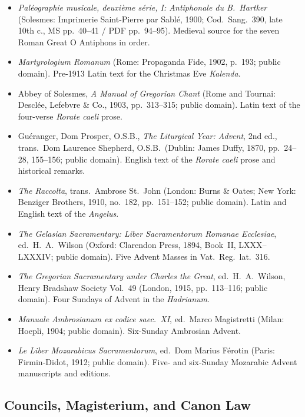 \begin{itemize}
(pp.~243--244), the Christmas Eve \textit{Kalenda} (p.~269), \textit{O magnum
mysterium} (p.~274), St.~Gregory's Homily~8 (p.~276), and \textit{O admirabile
commercium} and \textit{Quando natus es} (p.~315).
\item \textit{Pal\'eographie musicale, deuxi\`eme s\'erie, I: Antiphonale du
B.~Hartker} (Solesmes: Imprimerie Saint-Pierre par Sabl\'e, 1900; Cod.\ Sang.\
390, late 10th c., MS pp.~40--41 / PDF pp.~94--95). Medieval source for the
seven Roman Great O Antiphons in order.
\item \textit{Martyrologium Romanum} (Rome: Propaganda Fide, 1902, p.~193;
public domain). Pre-1913 Latin text for the Christmas Eve \textit{Kalenda}.
\item Abbey of Solesmes, \textit{A Manual of Gregorian Chant} (Rome and
Tournai: Descl\'ee, Lefebvre \& Co., 1903, pp.~313--315; public domain). Latin
text of the four-verse \textit{Rorate caeli} prose.
\item Gu\'eranger, Dom Prosper, O.S.B., \textit{The Liturgical Year: Advent},
2nd ed., trans.\ Dom Laurence Shepherd, O.S.B.\ (Dublin: James Duffy, 1870,
pp.~24--28, 155--156; public domain). English text of the \textit{Rorate caeli}
prose and historical remarks.
\item \textit{The Raccolta}, trans.\ Ambrose St.~John (London: Burns \& Oates;
New York: Benziger Brothers, 1910, no.~182, pp.~151--152; public domain). Latin
and English text of the \textit{Angelus}.
\item \textit{The Gelasian Sacramentary: Liber Sacramentorum Romanae
Ecclesiae}, ed.\ H.~A.~Wilson (Oxford: Clarendon Press, 1894, Book~II,
LXXX--LXXXIV; public domain). Five Advent Masses in Vat.\ Reg.\ lat.\ 316.
\item \textit{The Gregorian Sacramentary under Charles the Great}, ed.\
H.~A.~Wilson, Henry Bradshaw Society Vol.~49 (London, 1915, pp.~113--116;
public domain). Four Sundays of Advent in the \textit{Hadrianum}.
\item \textit{Manuale Ambrosianum ex codice saec.~XI}, ed.\ Marco Magistretti
(Milan: Hoepli, 1904; public domain). Six-Sunday Ambrosian Advent.
\item \textit{Le Liber Mozarabicus Sacramentorum}, ed.\ Dom Marius F\'erotin
(Paris: Firmin-Didot, 1912; public domain). Five- and six-Sunday Mozarabic
Advent manuscripts and editions.
\end{itemize}

\subsection{Councils, Magisterium, and Canon Law}

